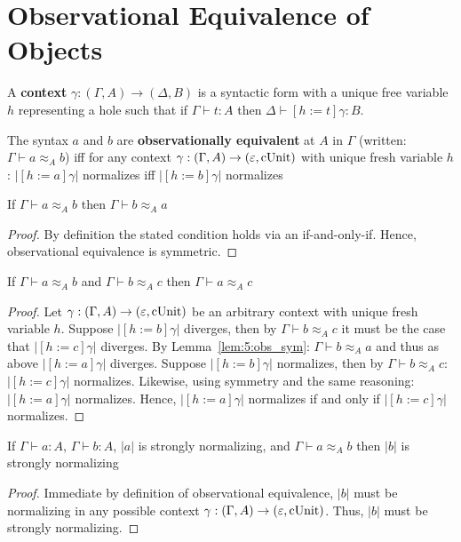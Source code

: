 \section{Observational Equivalence of Objects}

\begin{definition}
    A \textbf{context} $\gamma : (\Gamma, A) \to (\Delta, B)$ is a syntactic form with a unique free variable $h$ representing a hole such that if $\Gamma \vdash t : A$ then $\Delta \vdash [h := t]\gamma : B$.
\end{definition}

\begin{definition}
    The syntax $a$ and $b$ are \textbf{observationally equivalent} at $A$ in $\Gamma$ (written: $\Gamma \vdash a \approx_A b$) iff
    for any context $\gamma : (\Gamma, A) \to (\varepsilon, \textnormal{cUnit})$ with unique fresh variable $h$: $|[h := a]\gamma|$ normalizes iff $|[h := b]\gamma|$ normalizes
\end{definition}

\begin{lemma}
    \label{lem:5:obs_sym}
    If $\Gamma \vdash a \approx_A b$ then $\Gamma \vdash b \approx_A a$
\end{lemma}
\begin{proof}
    By definition the stated condition holds via an if-and-only-if.
    Hence, observational equivalence is symmetric.
\end{proof}

\begin{lemma}
    \label{lem:5:obs_trans}
    If $\Gamma \vdash a \approx_A b$ and $\Gamma \vdash b \approx_A c$ then $\Gamma \vdash a \approx_A c$
\end{lemma}
\begin{proof}
    Let $\gamma : (\Gamma, A) \to (\varepsilon, \textnormal{cUnit})$ be an arbitrary context with unique fresh variable $h$.
    Suppose $|[h := b]\gamma|$ diverges, then by $\Gamma \vdash b \approx_A c$ it must be the case that $|[h := c]\gamma|$ diverges.
    By Lemma~\ref{lem:5:obs_sym}: $\Gamma \vdash b \approx_A a$ and thus as above $|[h := a]\gamma|$ diverges.
    Suppose $|[h := b]\gamma|$ normalizes, then by $\Gamma \vdash b \approx_A c$: $|[h := c]\gamma|$ normalizes.
    Likewise, using symmetry and the same reasoning: $|[h := a]\gamma|$ normalizes.
    Hence, $|[h := a]\gamma|$ normalizes if and only if $|[h := c]\gamma|$ normalizes.
\end{proof}

\begin{lemma}
    \label{lem:5:obs_implies_sn}
    If $\Gamma \vdash a : A$, $\Gamma \vdash b : A$, $|a|$ is strongly normalizing, and $\Gamma \vdash a \approx_A b$ then $|b|$ is strongly normalizing
\end{lemma}
\begin{proof}
    Immediate by definition of observational equivalence, $|b|$ must be normalizing in any possible context $\gamma : (\Gamma, A) \to (\varepsilon, \textnormal{cUnit})$.
    Thus, $|b|$ must be strongly normalizing.
\end{proof}

